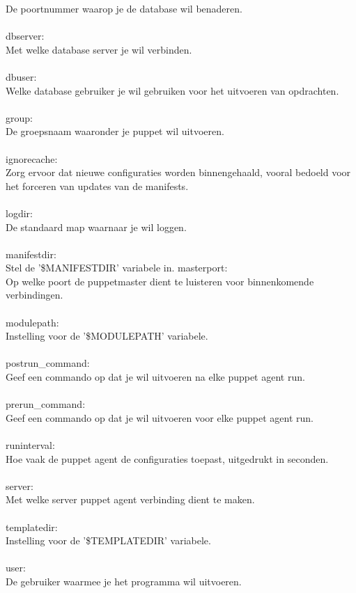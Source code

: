 De poortnummer waarop je de database wil benaderen.\\\\
%
dbserver:\\
Met welke database server je wil verbinden.\\\\
%
dbuser:\\
Welke database gebruiker je wil gebruiken voor het uitvoeren van opdrachten.\\\\
%
group:\\
De groepsnaam waaronder je puppet wil uitvoeren.\\\\
%
ignorecache:\\
Zorg ervoor dat nieuwe configuraties worden binnengehaald, vooral bedoeld voor het forceren van updates van de manifests.\\\\
%
logdir:\\
De standaard map waarnaar je wil loggen.\\\\
%
manifestdir:\\
Stel de '\$MANIFESTDIR' variabele in.
%
masterport:\\
Op welke poort de puppetmaster dient te luisteren voor binnenkomende verbindingen.\\\\
%
modulepath:\\
Instelling voor de '\$MODULEPATH' variabele.\\\\
%
postrun\_command:\\
Geef een commando op dat je wil uitvoeren na elke puppet agent run.\\\\
%
prerun\_command:\\
Geef een commando op dat je wil uitvoeren voor elke puppet agent run.\\\\
%
runinterval:\\
Hoe vaak de puppet agent de configuraties toepast, uitgedrukt in seconden.\\\\
%
server:\\
Met welke server puppet agent verbinding dient te maken.\\\\
%
templatedir:\\
Instelling voor de '\$TEMPLATEDIR' variabele.\\\\
%
user:\\
De gebruiker waarmee je het programma wil uitvoeren.\\\\
%
